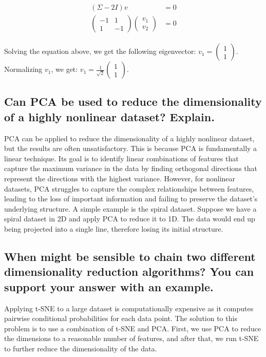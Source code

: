 \documentclass{article}
\begin{document}
\begin{eqnarray}
    \begin{aligned}
        (\Sigma - 2I)v &= 0 \\
        \begin{pmatrix}
            -1 & 1 \\
            1 & -1
        \end{pmatrix}
        \begin{pmatrix}
            v_1 \\
            v_2
        \end{pmatrix}
        &= 0 
    \end{aligned}
\end{eqnarray}

Solving the equation above, we get the following eigenvector: $v_1 = \begin{pmatrix}
    1 \\
    1
\end{pmatrix}$. Normalizing $v_1$, we get: $v_1 = \frac{1}{\sqrt{2}} \begin{pmatrix}
    1 \\
    1
\end{pmatrix}$.

\subsection{Can PCA be used to reduce the dimensionality of a highly nonlinear dataset? Explain.}
PCA can be applied to reduce the dimensionality of a highly nonlinear dataset, but the results are often unsatisfactory. This is because PCA is fundamentally a linear technique. Its goal is to identify linear combinations of features that capture the maximum variance in the data by finding orthogonal directions that represent the directions with the highest variance. However, for nonlinear datasets, PCA struggles to capture the complex relationships between features, leading to the loss of important information and failing to preserve the dataset's underlying structure. A simple example is the spiral dataset. Suppose we have a spiral dataset in 2D and apply PCA to reduce it to 1D. The data would end up being projected into a single line, therefore losing its initial structure.


\subsection{When might be sensible to chain two different dimensionality reduction algorithms? You can support your answer with an example.}
Applying t-SNE to a large dataset is computationally expensive as it computes pairwise conditional probabilities for each data point. The solution to this problem is to use a combination of t-SNE and PCA. First, we use PCA to reduce the dimensions to a reasonable number of features, and after that, we run t-SNE to further reduce the dimensionality of the data.
\end{document}
